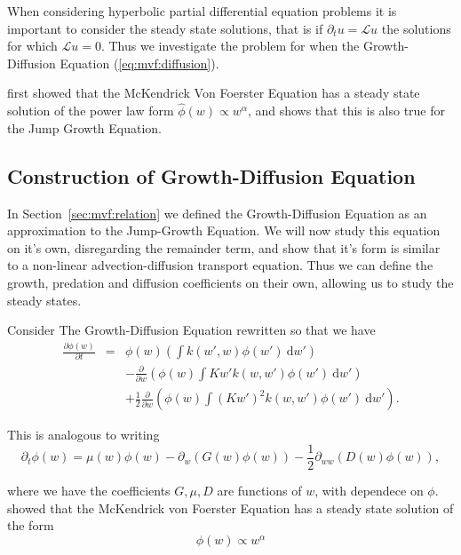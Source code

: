 When considering hyperbolic partial differential equation problems it is important to consider the steady state solutions, that is if $\partial_t u = \mathcal{L}u$ the solutions for which $\mathcal{L}u = 0$. Thus we investigate the problem for when the Growth-Diffusion Equation (\autoref{eq:mvf:diffusion}).

\cite{benoit2004} first showed that the McKendrick Von Foerster Equation has a steady state solution of the power law form $\hat{\phi}(w) \propto w^{\alpha}$, and \cite{datta2010} shows that this is also true for the Jump Growth Equation.

\subsection{Construction of Growth-Diffusion Equation}
In Section~\ref{sec:mvf:relation} we defined the Growth-Diffusion Equation as an approximation to the Jump-Growth Equation. We will now study this equation on it's own, disregarding the remainder term, and show that it's form is similar to a non-linear advection-diffusion transport equation. Thus we can define the growth, predation and diffusion coefficients on their own, allowing us to study the steady states.

Consider The Growth-Diffusion Equation rewritten so that we have
\begin{eqnarray}
  \frac{\partial \phi(w)}{\partial t}
  &=& \phi(w) \left( \int k(w', w) \phi(w') \: \mathrm{d}w' \right) \nonumber \\
  && -  \frac{\partial}{\partial w} \left( \phi(w)  \int K w' k(w, w')\phi(w') \: \mathrm{d}w' \right) \nonumber \\
  && + \frac{1}{2} \frac{\partial}{\partial w} \left( \phi(w) \int (K w')^2 k(w, w')\phi(w')  \: \mathrm{d}w' \right).
\end{eqnarray}

This is analogous to writing
\begin{equation}\label{eq:met:transport}
  \partial_t \phi(w) = \mu(w) \phi(w) - \partial_w(G(w) \phi(w)) - \frac{1}{2} \partial_{ww} ( D(w) \phi(w)),
\end{equation}

where we have the coefficients $G, \mu, D$ are functions of $w$, with dependece on $\phi$. \cite{benoit2004} showed that the McKendrick von Foerster Equation has a steady state solution of the form
\begin{equation}
  \phi(w) \propto w^{\alpha}
\end{equation}


